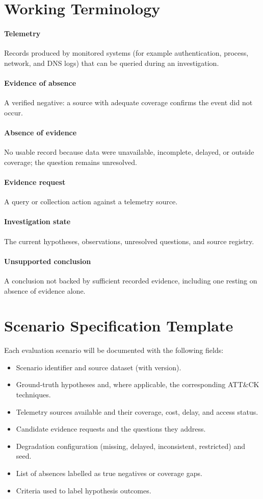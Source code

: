 \documentclass[a4paper,11pt,oneside]{article}
\begin{document}
\section{Working Terminology}
\paragraph{Telemetry} Records produced by monitored systems (for example authentication, process, network, and DNS logs) that can be queried during an investigation.
\paragraph{Evidence of absence} A verified negative: a source with adequate coverage confirms the event did not occur.
\paragraph{Absence of evidence} No usable record because data were unavailable, incomplete, delayed, or outside coverage; the question remains unresolved.
\paragraph{Evidence request} A query or collection action against a telemetry source.
\paragraph{Investigation state} The current hypotheses, observations, unresolved questions, and source registry.
\paragraph{Unsupported conclusion} A conclusion not backed by sufficient recorded evidence, including one resting on absence of evidence alone.
\section{Scenario Specification Template}
Each evaluation scenario will be documented with the following fields:
\begin{itemize}[leftmargin=*,itemsep=2pt]
\item Scenario identifier and source dataset (with version).
\item Ground-truth hypotheses and, where applicable, the corresponding ATT\&CK techniques.
\item Telemetry sources available and their coverage, cost, delay, and access status.
\item Candidate evidence requests and the questions they address.
\item Degradation configuration (missing, delayed, inconsistent, restricted) and seed.
\item List of absences labelled as true negatives or coverage gaps.
\item Criteria used to label hypothesis outcomes.
\end{itemize}
\end{document}
